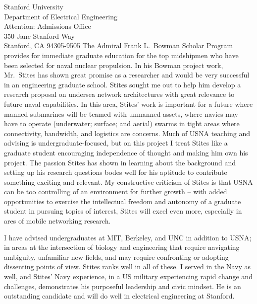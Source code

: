 \documentclass[10pt]{wrceletter}
\begin{document}
\begin{letter}{%
Stanford University\\
Department of Electrical Engineering\\
Attention: Admissions Office\\
350 Jane Stanford Way\\
Stanford, CA 94305-9505}
The Admiral Frank L.~Bowman Scholar Program provides for immediate graduate education for the top midshipmen who have been selected for naval nuclear propulsion. In his Bowman project work, Mr.~Stites has shown great promise as a researcher and would be very successful in an engineering graduate school. Stites sought me out to help him develop a research proposal on undersea network architectures with great relevance to future naval capabilities. In this area, Stites' work is important for a future where manned submarines will be teamed with unmanned assets, where navies may have to operate (underwater; surface; and aerial) swarms in tight areas where connectivity, bandwidth, and logistics are concerns. Much of USNA teaching and advising is undergraduate-focused, but on this project I treat Stites like a graduate student encouraging independence of thought and making him own his project. The passion Stites has shown in learning about the background and setting up his research questions bodes well for his aptitude to contribute something exciting and relevant. My constructive criticism of Stites is that USNA can be too controlling of an environment for further growth -- with added opportunities to exercise the intellectual freedom and autonomy of a graduate student in pursuing topics of interest, Stites will excel even more, especially in ares of mobile networking research.

I have advised undergraduates at MIT, Berkeley, and UNC in addition to USNA; in areas at the intersection of biology and engineering that require navigating ambiguity, unfamiliar new fields, and may require confronting or adopting dissenting points of view. Stites ranks well in all of these. I served in the Navy as well, and Stites' Navy experience, in a US military experiencing rapid change and challenges, demonstrates his purposeful leadership and civic mindset. He is an outstanding candidate and will do well in electrical engineering at Stanford.

\closing{~} %

\end{letter}
\end{document}

